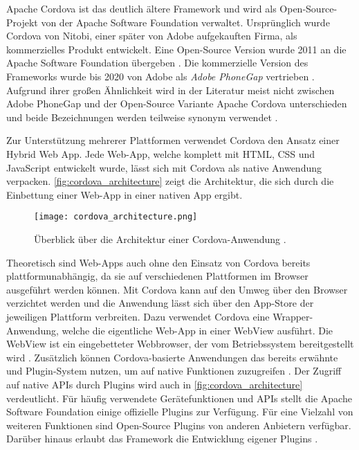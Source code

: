 Apache Cordova ist das deutlich ältere Framework und wird als Open-Source-Projekt von der Apache Software Foundation verwaltet.
Ursprünglich wurde Cordova von Nitobi, einer später von Adobe aufgekauften Firma, als kommerzielles Produkt entwickelt.
Eine Open-Source Version wurde 2011 an die Apache Software Foundation übergeben \cite{Steyer_Cordova}. %
Die kommerzielle Version des Frameworks wurde bis 2020 von Adobe als \textit{Adobe PhoneGap} vertrieben \cite{Adobe_PhoneGap_EOL}.
Aufgrund ihrer großen Ähnlichkeit wird in der Literatur meist nicht zwischen Adobe PhoneGap und der Open-Source Variante Apache Cordova unterschieden und beide Bezeichnungen werden teilweise synonym verwendet \cite{Steyer_Cordova,Manchanda_CrossPlatformFrameworks,Rieger_CrossPlatform_EvaluationFramework}. %

Zur Unterstützung mehrerer Plattformen verwendet Cordova den Ansatz einer Hybrid Web App.
Jede Web-App, welche komplett mit \ac{HTML}, \ac{CSS} und JavaScript entwickelt wurde, lässt sich mit Cordova als native Anwendung verpacken.
\autoref{fig:cordova_architecture} zeigt die Architektur, die sich durch die Einbettung einer Web-App in einer nativen App ergibt.
\begin{figure}[h]
    \centering
    \texttt{[image: cordova\_architecture.png]}
    \caption{Überblick über die Architektur einer Cordova-Anwendung \cite{Cordova_Overview}.}
    \label{fig:cordova_architecture}
\end{figure}



Theoretisch sind Web-Apps auch ohne den Einsatz von Cordova bereits plattformunabhängig, da sie auf verschiedenen Plattformen im Browser ausgeführt werden können.
Mit Cordova kann auf den Umweg über den Browser verzichtet werden und die Anwendung lässt sich über den App-Store der jeweiligen Plattform verbreiten.
Dazu verwendet Cordova eine Wrapper-Anwendung, welche die eigentliche Web-App in einer WebView ausführt.
Die WebView ist ein eingebetteter Webbrowser, der vom Betriebssystem bereitgestellt wird \cite{Steyer_Cordova}.
Zusätzlich können Cordova-basierte Anwendungen das bereits erwähnte und Plugin-System nutzen, um auf native Funktionen zuzugreifen \cite{Heitkoetter_CrossPlatform_Comparison}.
Der Zugriff auf native \acp{API} durch Plugins wird auch in \autoref{fig:cordova_architecture} verdeutlicht.
Für häufig verwendete Gerätefunktionen und \acp{API} stellt die Apache Software Foundation einige offizielle Plugins zur Verfügung.
Für eine Vielzahl von weiteren Funktionen sind Open-Source Plugins von anderen Anbietern verfügbar. 
Darüber hinaus erlaubt das Framework die Entwicklung eigener Plugins \cite{Cordova_Overview}.

